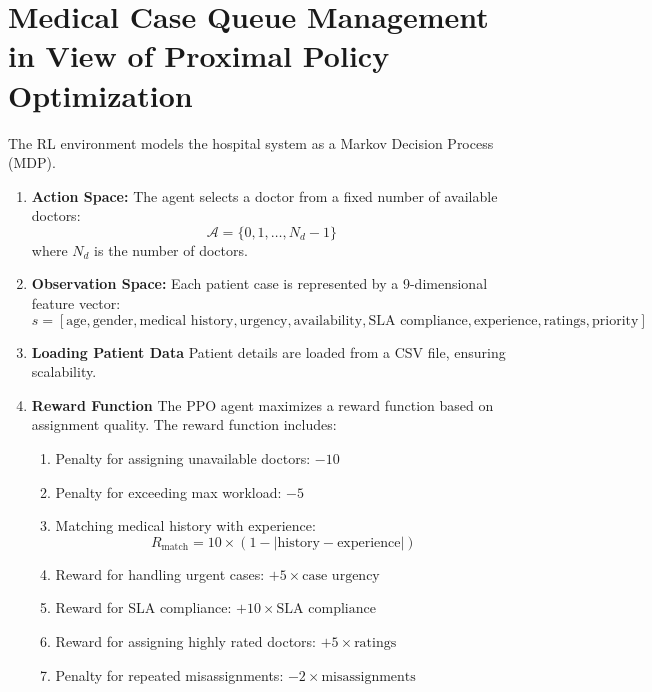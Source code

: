 \documentclass[11pt]{article}
\begin{document}
\section{Medical Case Queue Management in View of Proximal Policy Optimization}
The RL environment models the hospital system as a Markov Decision Process (MDP).
\begin{enumerate}
	\item \textbf{Action Space:} The agent selects a doctor from a fixed number of available doctors:
	\begin{equation}
		\mathcal{A} = \{ 0, 1, \dots, N_d - 1 \}
	\end{equation}
	where $N_d$ is the number of doctors.
	
	\item \textbf{Observation Space:}
	Each patient case is represented by a 9-dimensional feature vector:
	\begin{equation}
		s = [\text{age}, \text{gender}, \text{medical history}, \text{urgency}, \text{availability}, \text{SLA compliance}, \text{experience}, \text{ratings}, \text{priority}]
	\end{equation}
	
	\item \textbf{Loading Patient Data}
	Patient details are loaded from a CSV file, ensuring scalability.
	
\item 	\textbf{Reward Function}
	The PPO agent maximizes a reward function based on assignment quality. The reward function includes:
	\begin{enumerate}
		\item Penalty for assigning unavailable doctors: $-10$
		\item Penalty for exceeding max workload: $-5$
		\item Matching medical history with experience:
		\begin{equation}
			R_\text{match} = 10 \times (1 - |\text{history} - \text{experience}|)
		\end{equation}
		\item Reward for handling urgent cases: $+5 \times \text{case urgency}$
		\item Reward for SLA compliance: $+10 \times \text{SLA compliance}$
		\item Reward for assigning highly rated doctors: $+5 \times \text{ratings}$
		\item Penalty for repeated misassignments: $-2 \times \text{misassignments}$
	\end{enumerate}
	

\end{enumerate}
\end{document}
